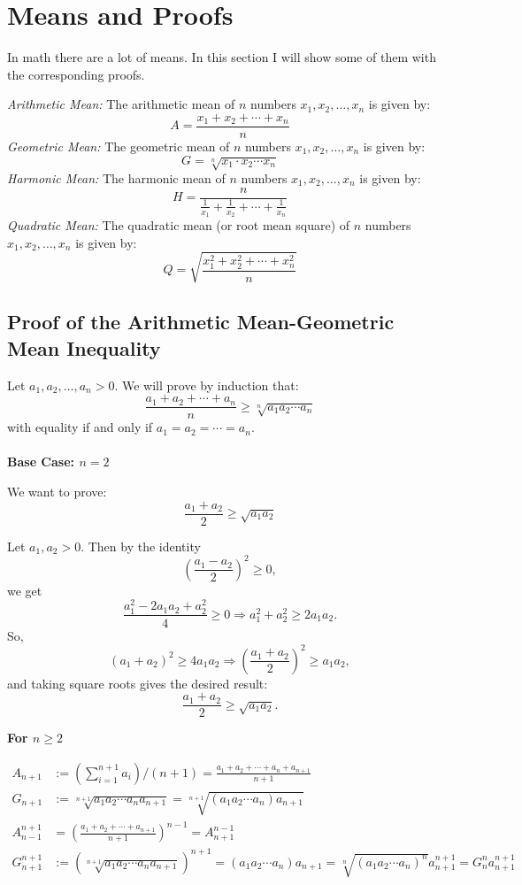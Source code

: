 \section{Means and Proofs}
In math there are a lot of means. In this section I will show some of them with the corresponding proofs.

\emph{Arithmetic Mean:} The arithmetic mean of \( n \) numbers \( x_1, x_2, \dots, x_n \) is given by:
	      \[
		      A = \frac{x_1 + x_2 + \cdots + x_n}{n}
	      \]
\emph{Geometric Mean:} The geometric mean of \( n \) numbers \( x_1, x_2, \dots, x_n \) is given by:
	      \[
		      G = \sqrt[n]{x_1 \cdot x_2 \cdots x_n}
	      \]
\emph{Harmonic Mean:} The harmonic mean of \( n \) numbers \( x_1, x_2, \dots, x_n \) is given by:
	      \[
		      H = \frac{n}{\frac{1}{x_1} + \frac{1}{x_2} + \cdots + \frac{1}{x_n}}
	      \]
\emph{Quadratic Mean:} The quadratic mean (or root mean square) of \( n \) numbers \( x_1, x_2, \dots, x_n \) is given by:
	      \[
		      Q = \sqrt{\frac{x_1^2 + x_2^2 + \cdots + x_n^2}{n}}
	      \]

\subsection{Proof of the Arithmetic Mean-Geometric Mean Inequality}

Let \( a_1, a_2, \dots, a_n > 0 \). We will prove by induction that:
\[
	\frac{a_1 + a_2 + \cdots + a_n}{n} \geq \sqrt[n]{a_1 a_2 \cdots a_n}
\]
with equality if and only if \( a_1 = a_2 = \cdots = a_n \).
\\\\
\textbf{Base Case: \( n = 2 \)}

We want to prove:
\[
	\frac{a_1 + a_2}{2} \geq \sqrt{a_1 a_2}
\]

Let \( a_1, a_2 > 0 \). Then by the identity
\[
	\left( \frac{a_1 - a_2}{2} \right)^2 \geq 0,
\]
we get
\[
	\frac{a_1^2 - 2a_1a_2 + a_2^2}{4} \geq 0 \Rightarrow a_1^2 + a_2^2 \geq 2a_1a_2.
\]
So,
\[
	(a_1 + a_2)^2 \geq 4a_1a_2 \Rightarrow \left( \frac{a_1 + a_2}{2} \right)^2 \geq a_1a_2,
\]
and taking square roots gives the desired result:
\[
	\frac{a_1 + a_2}{2} \geq \sqrt{a_1 a_2}.
\]

\textbf{For \( n \geq 2 \)}

\begin{align*}
	A_{n + 1} &:= (\sum_{i=1}^{n + 1} a_i) / (n + 1) = \frac{a_1 + a_2 + \cdots + a_n + a_{n + 1}}{n + 1}\\
	G_{n + 1} &:= \sqrt[n + 1]{a_1 a_2 \cdots a_n a_{n + 1}} = \sqrt[n + 1]{(a_1 a_2 \cdots a_n) a_{n + 1}}\\
	A_{n - 1}^{n + 1}&= (\frac{a_1 + a_2 + \cdots + a_{n + 1}}{n + 1})^{n - 1} = A_{n + 1}^{n - 1}\\
	G_{n + 1}^{n + 1} &:= (\sqrt[n + 1]{a_1 a_2 \cdots a_n a_{n + 1}})^{n + 1} = (a_1 a_2 \cdots a_n) a_{n + 1} = \sqrt[n]{(a_1 a_2 \cdots a_n)^{n}} a_{n + 1}^{n + 1} = G_{n}^{n} a_{n + 1}^{n + 1}
\end{align*}

